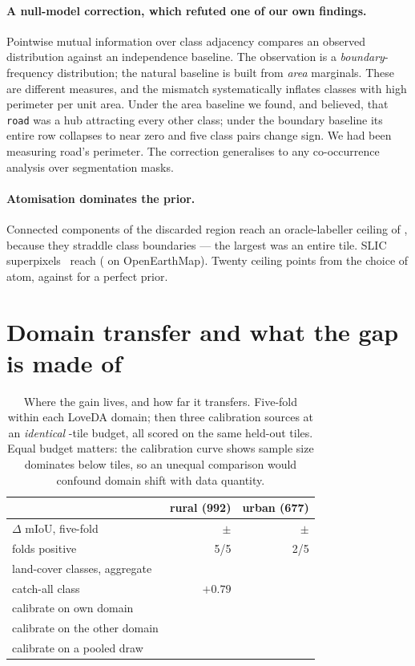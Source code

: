 \documentclass[10pt,a4paper]{article}                        %
\newcommand{\best}[1]{\textbf{#1}}
\begin{document}
\paragraph{A null-model correction, which refuted one of our own findings.}
Pointwise mutual information over class adjacency compares an observed
distribution against an independence baseline. The observation is a
\emph{boundary}-frequency distribution; the natural baseline is built from
\emph{area} marginals. These are different measures, and the mismatch
systematically inflates classes with high perimeter per unit area. Under the area
baseline we found, and believed, that \texttt{road} was a hub attracting every
other class; under the boundary baseline its entire row collapses to near zero
and five class pairs change sign. We had been measuring road's perimeter. The
correction generalises to any co-occurrence analysis over segmentation masks.

\paragraph{Atomisation dominates the prior.} Connected components of the
discarded region reach an oracle-labeller ceiling of \ceilCC{}, because they
straddle class boundaries --- the largest was an entire tile. SLIC
superpixels~\cite{slic} reach \ceilSLIC{} (\ceilSLICoem{} on OpenEarthMap).
Twenty ceiling points from the choice of atom, against \priorOracle{} for a
perfect prior.


\section{Domain transfer and what the gap is made of}
\label{sup:domain}

\begin{table}[t]\centering\small
\caption{Where the gain lives, and how far it transfers. Five-fold within each
LoveDA domain; then three calibration sources at an \emph{identical}
\calibTiles{}-tile budget, all scored on the same held-out tiles. Equal budget
matters: the calibration curve shows sample size dominates below
\calibTiles{} tiles, so an unequal comparison would confound domain shift with
data quantity.}
\label{tab:domain}
\begin{tabular}{lrr}
\toprule
 & rural (992) & urban (677) \\
\midrule
$\Delta$ mIoU, five-fold        & \best{\DOMr{} $\pm$ \DOMrsd{}} & \DOMu{} $\pm$ \DOMusd{} \\
folds positive                  & 5/5 & 2/5 \\
land-cover classes, aggregate   & \best{\DOMrreal{}} & \best{\DOMureal{}} \\
catch-all class                 & $+0.79$ & \DOMubg{} \\
\midrule
calibrate on own domain         & \DOMmr{} & \DOMmu{} \\
calibrate on the other domain   & \DOMxr{} & \DOMxu{} \\
calibrate on a pooled draw      & \DOMpr{} & \DOMpu{} \\
\bottomrule
\end{tabular}
\end{table}
\end{document}
